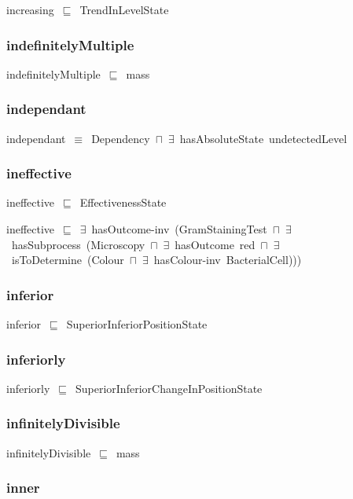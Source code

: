 \documentclass{article}
\begin{document}
increasing~\ensuremath{\sqsubseteq}~TrendInLevelState~

\subsubsection*{indefinitelyMultiple}

indefinitelyMultiple~\ensuremath{\sqsubseteq}~mass~

\subsubsection*{independant}

independant~\ensuremath{\equiv}~Dependency~\ensuremath{\sqcap}~\ensuremath{\exists}~hasAbsoluteState~undetectedLevel

\subsubsection*{ineffective}

ineffective~\ensuremath{\sqsubseteq}~EffectivenessState~

ineffective~\ensuremath{\sqsubseteq}~\ensuremath{\exists}~hasOutcome-inv~(GramStainingTest~\ensuremath{\sqcap}~\ensuremath{\exists}~hasSubprocess~(Microscopy~\ensuremath{\sqcap}~\ensuremath{\exists}~hasOutcome~red~\ensuremath{\sqcap}~\ensuremath{\exists}~isToDetermine~(Colour~\ensuremath{\sqcap}~\ensuremath{\exists}~hasColour-inv~BacterialCell)))~

\subsubsection*{inferior}

inferior~\ensuremath{\sqsubseteq}~SuperiorInferiorPositionState~

\subsubsection*{inferiorly}

inferiorly~\ensuremath{\sqsubseteq}~SuperiorInferiorChangeInPositionState~

\subsubsection*{infinitelyDivisible}

infinitelyDivisible~\ensuremath{\sqsubseteq}~mass~

\subsubsection*{inner}
\end{document}
